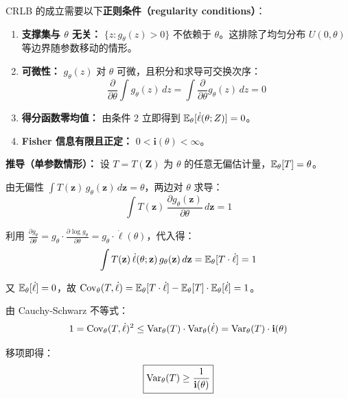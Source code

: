 CRLB 的成立需要以下\textbf{正则条件（regularity conditions）}：

\begin{enumerate}
    \item \textbf{支撑集与 $\theta$ 无关：} $\{z: g_\theta(z) > 0\}$ 不依赖于 $\theta$。这排除了均匀分布 $U(0,\theta)$ 等边界随参数移动的情形。
    \item \textbf{可微性：} $g_\theta(z)$ 对 $\theta$ 可微，且积分和求导可交换次序：
    \begin{equation}
        \frac{\partial}{\partial\theta}\int g_\theta(z)\,dz = \int \frac{\partial}{\partial\theta}g_\theta(z)\,dz = 0
    \end{equation}
    \item \textbf{得分函数零均值：} 由条件 2 立即得到 $\mathbb{E}_\theta[\dot{\ell}(\theta; Z)] = 0$。
    \item \textbf{Fisher 信息有限且正定：} $0 < \mathbf{i}(\theta) < \infty$。
\end{enumerate}

\textbf{推导（单参数情形）：} 设 $T = T(\mathbf{Z})$ 为 $\theta$ 的任意无偏估计量，$\mathbb{E}_\theta[T] = \theta$。

由无偏性 $\int T(\mathbf{z})\,g_\theta(\mathbf{z})\,d\mathbf{z} = \theta$，两边对 $\theta$ 求导：
\begin{equation}\label{eq:cr_deriv1}
    \int T(\mathbf{z})\,\frac{\partial g_\theta(\mathbf{z})}{\partial\theta}\,d\mathbf{z} = 1
\end{equation}

利用 $\frac{\partial g_\theta}{\partial\theta} = g_\theta \cdot \frac{\partial\log g_\theta}{\partial\theta} = g_\theta \cdot \dot{\ell}(\theta)$，代入得：
\begin{equation}\label{eq:cr_deriv2}
    \int T(\mathbf{z})\,\dot{\ell}(\theta; \mathbf{z})\,g_\theta(\mathbf{z})\,d\mathbf{z} = \mathbb{E}_\theta[T\cdot\dot{\ell}] = 1
\end{equation}

又 $\mathbb{E}_\theta[\dot{\ell}] = 0$，故 $\mathrm{Cov}_\theta(T, \dot{\ell}) = \mathbb{E}_\theta[T\cdot\dot{\ell}] - \mathbb{E}_\theta[T]\cdot\mathbb{E}_\theta[\dot{\ell}] = 1$。

由 Cauchy-Schwarz 不等式：
\begin{equation}\label{eq:cr_deriv3}
    1 = \mathrm{Cov}_\theta(T, \dot{\ell})^2 \leq \mathrm{Var}_\theta(T)\cdot\mathrm{Var}_\theta(\dot{\ell}) = \mathrm{Var}_\theta(T)\cdot\mathbf{i}(\theta)
\end{equation}

移项即得：
\begin{equation}\label{eq:cr_deriv4}
    \boxed{\mathrm{Var}_\theta(T) \geq \frac{1}{\mathbf{i}(\theta)}}
\end{equation}

